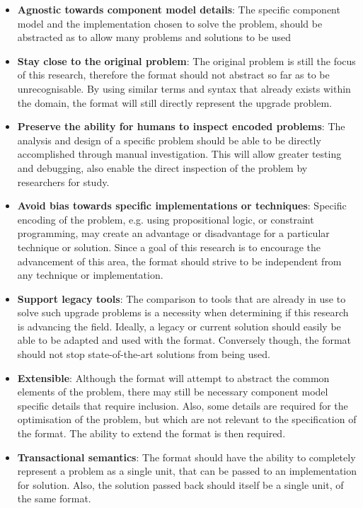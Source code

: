 \begin{itemize}
  \item \textbf{Agnostic towards component model details}: 
  The specific component model and the implementation chosen to solve the problem, should be abstracted as to allow many problems and solutions to be used  
  \item \textbf{Stay close to the original problem}: 
  The original problem is still the focus of this research, therefore the format should not abstract so far as to be unrecognisable. 
  By using similar terms and syntax that already exists within the domain, the format will still directly represent the upgrade problem. 
  \item \textbf{Preserve the ability for humans to inspect encoded problems}:
  The analysis and design of a specific problem should be able to be directly accomplished through manual investigation.
  This will allow greater testing and debugging, also enable the direct inspection of the problem by researchers for study.
  \item \textbf{Avoid bias towards specific implementations or techniques}:
  Specific encoding of the problem, e.g. using propositional logic, or constraint programming, may create an advantage or disadvantage for a particular technique or solution.
  Since a goal of this research is to encourage the advancement of this area, the format should strive to be independent from any technique or implementation. 
  \item \textbf{Support legacy tools}:
  The comparison to tools that are already in use to solve such upgrade problems is a necessity when determining if this research is advancing the field.
  Ideally, a legacy or current solution should easily be able to be adapted and used with the format.
  Conversely though, the format should not stop state-of-the-art solutions from being used.
  \item \textbf{Extensible}:
  Although the format will attempt to abstract the common elements of the problem, there may still be necessary component model specific details that require inclusion.
  Also, some details are required for the optimisation of the problem, but which are not relevant to the specification of the format.
  The ability to extend the format is then required.
  \item \textbf{Transactional semantics}:
  The format should have the ability to completely represent a problem as a single unit, that can be passed to an implementation for solution.
  Also, the solution passed back should itself be a single unit, of the same format.

\end{itemize}
